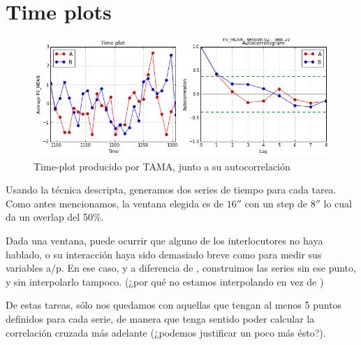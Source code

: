 \section{Time plots}

\begin{figure}
\centering
\includegraphics[width=15cm]{images/time_plot_with_autocorrelation.png}
\caption{Time-plot producido por TAMA, junto a su autocorrelación \label{time_plot}}

\end{figure}

Usando la técnica descripta, generamos dos series de tiempo para cada tarea. Como antes mencionamos, la ventana elegida es de $16''$ con un step de $8''$ lo cual da un overlap del 50\%.

Dada una ventana, puede ocurrir que alguno de los interlocutores no haya hablado, o su interacción haya sido demasiado breve como para medir sus variables a/p. En ese caso, y a diferencia de \cite{KOU2008}, construimos las series sin ese punto, y sin interpolarlo tampoco. (¿por qué no estamos interpolando en vez de )

De estas tareas, sólo nos quedamos con aquellas que tengan al menos 5 puntos definidos para cada serie, de manera que tenga sentido poder calcular la correlación cruzada más adelante (¿podemos justificar un poco más ésto?).